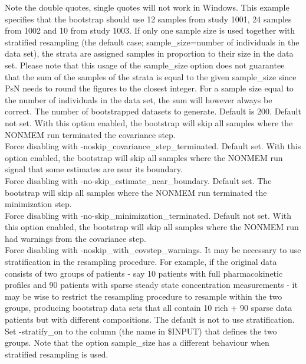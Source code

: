 \begin{optionlist}
Note the double quotes, single quotes will not work in Windows. This example specifies that the bootstrap should use 12 samples from study 1001, 24 samples from 1002 and 10 from study 1003. If only one sample size is used together with stratified resampling (the default case; sample\_size=number of individuals in the data set), the strata are assigned samples in proportion to their size in the data set. Please note that this usage of the sample\_size option does not guarantee that the sum of the samples of the strata is equal to the given sample\_size since PsN needs to round the figures to the closest integer. For a sample size equal to the number of individuals in the data set, the sum will however always be correct. 
\nextopt
{}
The number of bootstrapped datasets to generate. Default is 200. 
\nextopt
{}
Default not set. With this option enabled, the bootstrap will skip all samples where the NONMEM run terminated the covariance step.\\
Force disabling with -no\-skip\_covariance\_step\_terminated.
\nextopt
{}
Default set. With this option enabled, the bootstrap will skip all samples where the NONMEM run signal that some estimates are near its boundary.\\
Force disabling with -no-skip\_estimate\_near\_boundary.
\nextopt
{}
Default set. The bootstrap will skip all samples where the NONMEM run terminated the minimization step.\\ 
Force disabling with -no-skip\_minimization\_terminated. 
\nextopt
{}
Default not set. With this option enabled, the bootstrap will skip all samples
where the NONMEM run had warnings from the covariance step.\\
Force disabling with -no\-skip\_with\_covstep\_warnings.
\nextopt
{}
It may be necessary to use stratification in the resampling procedure. For example, if the original data consists of two groups of patients - say 10 patients with full pharmacokinetic profiles and 90 patients with sparse steady state concentration measurements - it may be wise to restrict the resampling procedure to resample within the two groups, producing bootstrap data sets that all contain 10 rich + 90 sparse data patients but with different compositions. The default is not to use stratification. Set -stratify\_on to the column (the name in \$INPUT) that defines the two groups. Note that the option sample\_size has a different behaviour when stratified resampling is used.\\

\end{optionlist}
